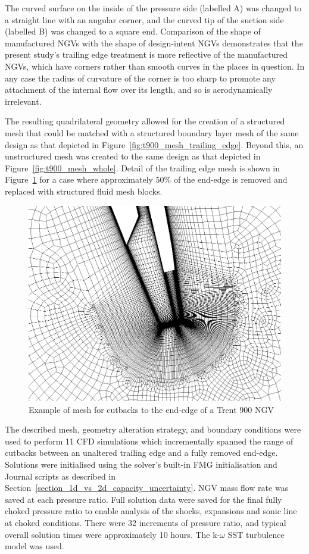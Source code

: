 \documentclass[a4paper, 11pt, oneside]{report}
\begin{document}
The curved surface on the inside of the pressure side (labelled A) was changed to a straight line with an angular corner, and the curved tip of the suction side (labelled B) was changed to a square end. Comparison of the shape of manufactured NGVs with the shape of design-intent NGVs demonstrates that the present study's trailing edge treatment is more reflective of the manufactured NGVs, which have corners rather than smooth curves in the places in question. In any case the radius of curvature of the corner is too sharp to promote any attachment of the internal flow over its length, and so is aerodynamically irrelevant.

The resulting quadrilateral geometry allowed for the creation of a structured mesh that could be matched with a structured boundary layer mesh of the same design as that depicted in Figure~\ref{fig:t900_mesh_trailing_edge}. Beyond this, an unstructured mesh was created to the same design as that depicted in Figure~\ref{fig:t900_mesh_whole}. Detail of the trailing edge mesh is shown in Figure~\ref{fig:T900_ss_cutbacks_mesh} for a case where approximately $50\%$ of the end-edge is removed and replaced with structured fluid mesh blocks.

\begin{figure}[H]
      \centering
      \includegraphics[width=.9\textwidth]{figs/T900_ss_cutbacks_mesh.png}
      \caption{Example of mesh for cutbacks to the end-edge of a Trent 900 NGV}
      \label{fig:T900_ss_cutbacks_mesh}
\end{figure}

The described mesh, geometry alteration strategy, and boundary conditions were used to perform 11 CFD simulations which incrementally spanned the range of cutbacks between an unaltered trailing edge and a fully removed end-edge. Solutions were initialised using the solver's built-in FMG initialisation and Journal scripts as described in Section~\ref{section_1d_vs_2d_capacity_uncertainty}. NGV mass flow rate was saved at each pressure ratio. Full solution data were saved for the final fully choked pressure ratio to enable analysis of the shocks, expansions and sonic line at choked conditions. There were 32 increments of pressure ratio, and typical overall solution times were approximately 10 hours. The k-$\omega$ SST turbulence model was used.
\end{document}
